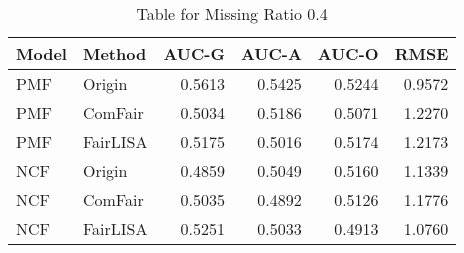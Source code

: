 \begin{table}
\centering
\caption{Table for Missing Ratio 0.4}
\label{tab:missing_0.4}
\begin{tabular}{llrrrr}
\toprule
Model &   Method &  AUC-G &  AUC-A &  AUC-O &   RMSE \\
\midrule
  PMF &   Origin & 0.5613 & 0.5425 & 0.5244 & 0.9572 \\
  PMF &  ComFair & 0.5034 & 0.5186 & 0.5071 & 1.2270 \\
  PMF & FairLISA & 0.5175 & 0.5016 & 0.5174 & 1.2173 \\
  NCF &   Origin & 0.4859 & 0.5049 & 0.5160 & 1.1339 \\
  NCF &  ComFair & 0.5035 & 0.4892 & 0.5126 & 1.1776 \\
  NCF & FairLISA & 0.5251 & 0.5033 & 0.4913 & 1.0760 \\
\bottomrule
\end{tabular}
\end{table}

